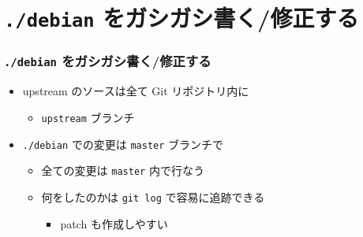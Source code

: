 \documentclass[10pt,final,c,dvipdfmx,cjk,colorlinks=false]{beamer}
\begin{document}
\section{\texttt{./debian} をガシガシ書く/修正する}
\label{sec-3}
\begin{frame}
\frametitle{\texttt{./debian} をガシガシ書く/修正する}
\label{sec-3-1}



\begin{itemize}
\item upstream のソースは全て Git リポジトリ内に
\begin{itemize}
\item \texttt{upstream} ブランチ
\end{itemize}
\item \texttt{./debian} での変更は \texttt{master} ブランチで
\begin{itemize}
\item 全ての変更は \texttt{master} 内で行なう
\item 何をしたのかは \texttt{git log} で容易に追跡できる
\begin{itemize}
\item patch も作成しやすい
\end{itemize}
\end{itemize}
\end{itemize}
\end{frame}
\end{document}
